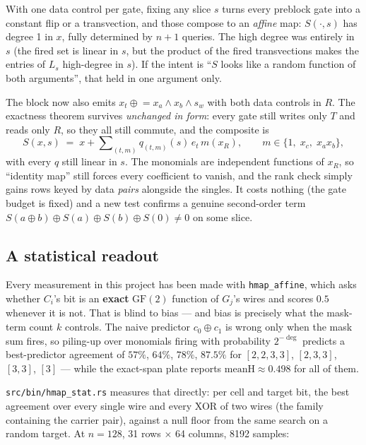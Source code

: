\documentclass[11pt]{article}
\newcommand{\xor}{\oplus}
\begin{document}
With one data control per gate, fixing any slice $s$ turns every preblock gate
into a constant flip or a transvection, and those compose to an \emph{affine}
map: $S(\cdot,s)$ has degree 1 in $x$, fully determined by $n{+}1$ queries. The
high degree was entirely in $s$ (the fired set is linear in $s$, but the product
of the fired transvections makes the entries of $L_s$ high-degree in $s$). If
the intent is ``$S$ looks like a random function of both arguments'', that held
in one argument only.

The block now also emits $x_t \mathrel{\xor}= x_a \wedge x_b \wedge s_w$ with
both data controls in $R$. The exactness theorem survives \emph{unchanged in
form}: every gate still writes only $T$ and reads only $R$, so they all still
commute, and the composite is
\[
S(x,s) \;=\; x + \sum\nolimits_{(t,m)} q_{(t,m)}(s)\, e_t\, m(x_R),
\qquad m \in \{1,\; x_c,\; x_a x_b\},
\]
with every $q$ still linear in $s$. The monomials are independent functions of
$x_R$, so ``identity map'' still forces every coefficient to vanish, and the
rank check simply gains rows keyed by data \emph{pairs} alongside the singles.
It costs nothing (the gate budget is fixed) and a new test confirms a genuine
second-order term $S(a\xor b)\xor S(a)\xor S(b)\xor S(0)\neq 0$ on some slice.

\subsection{A statistical readout}

Every measurement in this project has been made with \texttt{hmap\_affine},
which asks whether $C_i$'s bit is an \textbf{exact} $\mathrm{GF}(2)$ function of
$G_j$'s wires and scores $0.5$ whenever it is not. That is blind to bias --- and
bias is precisely what the mask-term count $k$ controls. The naive predictor
$c_0 \xor c_1$ is wrong only when the mask sum fires, so piling-up over
monomials firing with probability $2^{-\deg}$ predicts a best-predictor
agreement of $57\%$, $64\%$, $78\%$, $87.5\%$ for
$[2,2,3,3]$, $[2,3,3]$, $[3,3]$, $[3]$ --- while the exact-span plate reports
$\mathrm{meanH}\approx 0.498$ for all of them.

\texttt{src/bin/hmap\_stat.rs} measures that directly: per cell and target bit,
the best agreement over every single wire and every XOR of two wires (the family
containing the carrier pair), against a null floor from the same search on a
random target. At $n{=}128$, 31 rows $\times$ 64 columns, 8192 samples:
\end{document}
